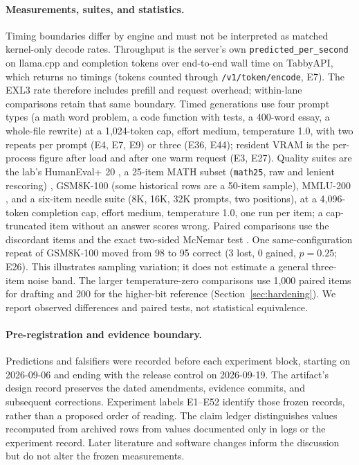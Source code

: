 \documentclass[11pt]{article}
\newcommand{\q}[1]{\texttt{#1}}
\begin{document}
\paragraph{Measurements, suites, and statistics.}
Timing boundaries differ by engine and must not be interpreted as matched
kernel-only decode rates. Throughput is the server's own \q{predicted\_per\_second} on llama.cpp and
completion tokens over end-to-end wall time on TabbyAPI, which returns no
timings (tokens counted through \q{/v1/token/encode}, E7). The EXL3 rate
therefore includes prefill and request overhead; within-lane comparisons
retain that same boundary. Timed generations
use four prompt types (a math word problem, a code function with tests, a
400-word essay, a whole-file rewrite) at a 1,024-token cap, effort medium,
temperature 1.0, with two repeats per prompt (E4, E7, E9) or three (E36,
E44); resident VRAM is the per-process figure after load and after one warm
request (E3, E27). Quality suites are the lab's HumanEval+ 20
\citep{chen2021humaneval,liu2023evalplus}, a 25-item MATH subset (\q{math25},
raw and lenient rescoring) \citep{hendrycks2021math}, GSM8K-100
\citep{cobbe2021gsm8k} (some historical rows are a 50-item sample), MMLU-200
\citep{hendrycks2021mmlu}, and a six-item needle suite (8K, 16K, 32K prompts,
two positions), at a 4,096-token completion cap, effort medium, temperature
1.0, one run per item; a cap-truncated item without an answer scores wrong.
Paired comparisons use the discordant items and the exact two-sided McNemar
test \citep{mcnemar1947}. One same-configuration repeat of GSM8K-100 moved
from 98 to 95 correct (3 lost, 0 gained, $p=0.25$; E26). This illustrates
sampling variation; it does not estimate a general three-item noise band.
The larger temperature-zero comparisons use 1,000 paired items for drafting
and 200 for the higher-bit reference (Section~\ref{sec:hardening}). We report
observed differences and paired tests, not statistical equivalence.

\paragraph{Pre-registration and evidence boundary.}
Predictions and falsifiers were recorded before each experiment block,
starting on 2026-09-06 and ending with the release control on 2026-09-19.
The artifact's design record preserves the dated amendments, evidence commits,
and subsequent corrections. Experiment labels E1--E52 identify those frozen
records, rather than a proposed order of reading. The claim ledger distinguishes
values recomputed from archived rows from values documented only in logs or
the experiment record. Later literature and software changes inform the
discussion but do not alter the frozen measurements.
\end{document}
